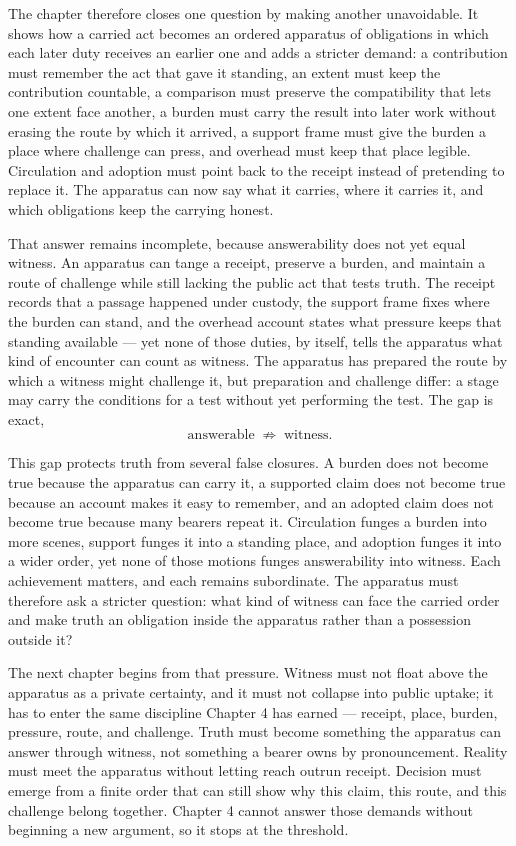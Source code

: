 The chapter therefore closes one question by making another unavoidable. It shows how a carried act becomes an ordered apparatus of obligations in which each later duty receives an earlier one and adds a stricter demand: a contribution must remember the act that gave it standing, an extent must keep the contribution countable, a comparison must preserve the compatibility that lets one extent face another, a burden must carry the result into later work without erasing the route by which it arrived, a support frame must give the burden a place where challenge can press, and overhead must keep that place legible. Circulation and adoption must point back to the receipt instead of pretending to replace it. The apparatus can now say what it carries, where it carries it, and which obligations keep the carrying honest.

That answer remains incomplete, because answerability does not yet equal witness. An apparatus can tange a receipt, preserve a burden, and maintain a route of challenge while still lacking the public act that tests truth. The receipt records that a passage happened under custody, the support frame fixes where the burden can stand, and the overhead account states what pressure keeps that standing available --- yet none of those duties, by itself, tells the apparatus what kind of encounter can count as witness. The apparatus has prepared the route by which a witness might challenge it, but preparation and challenge differ: a stage may carry the conditions for a test without yet performing the test. The gap is exact,
\[ \text{answerable} \;\not\Rightarrow\; \text{witness}. \]

This gap protects truth from several false closures. A burden does not become true because the apparatus can carry it, a supported claim does not become true because an account makes it easy to remember, and an adopted claim does not become true because many bearers repeat it. Circulation funges a burden into more scenes, support funges it into a standing place, and adoption funges it into a wider order, yet none of those motions funges answerability into witness. Each achievement matters, and each remains subordinate. The apparatus must therefore ask a stricter question: what kind of witness can face the carried order and make truth an obligation inside the apparatus rather than a possession outside it?

The next chapter begins from that pressure. Witness must not float above the apparatus as a private certainty, and it must not collapse into public uptake; it has to enter the same discipline Chapter 4 has earned --- receipt, place, burden, pressure, route, and challenge. Truth must become something the apparatus can answer through witness, not something a bearer owns by pronouncement. Reality must meet the apparatus without letting reach outrun receipt. Decision must emerge from a finite order that can still show why this claim, this route, and this challenge belong together. Chapter 4 cannot answer those demands without beginning a new argument, so it stops at the threshold.

